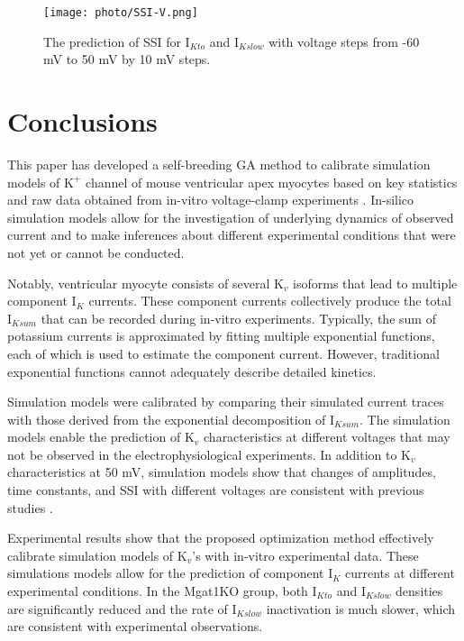 \documentclass[journal]{IEEEtran}
\begin{document}
\begin{figure}
    \label{fig 10}
    \centering
    \texttt{[image: photo/SSI-V.png]}
    \caption{The prediction of SSI for $\text{I}_{Kto}$ and $\text{I}_{Kslow}$ with voltage steps from -60 mV to 50 mV by 10 mV steps.} 
\end{figure}

\section{Conclusions}
This paper has developed a self-breeding GA method to calibrate simulation models of $\text{K}^{+}$ channel of mouse ventricular apex myocytes based on key statistics and raw data obtained from in-vitro voltage-clamp experiments \cite{ednie2019reduced}. In-silico simulation models allow for the investigation of underlying dynamics of observed current and to make inferences about different experimental conditions that were not yet or cannot be conducted.

Notably, ventricular myocyte consists of several $\text{K}_{v}$ isoforms that lead to multiple component $\text{I}_{K}$ currents. These component currents collectively produce the total $\text{I}_{Ksum}$ that can be recorded during in-vitro experiments. Typically, the sum of potassium currents is approximated by fitting multiple exponential functions, each of which is used to estimate the component current. However, traditional exponential functions cannot adequately describe detailed kinetics.

Simulation models were calibrated by comparing their simulated current traces with those derived from the exponential decomposition of $\text{I}_{Ksum}$. The simulation models enable the prediction of $\text{K}_{v}$ characteristics at different voltages that may not be observed in the electrophysiological experiments. In addition to $\text{K}_{v}$ characteristics at 50 mV, simulation models show that changes of amplitudes, time constants, and SSI with different voltages are consistent with previous studies \cite{ednie2019reduced}.

Experimental results show that the proposed optimization method effectively calibrate simulation models of $\text{K}_{v}$'s with in-vitro experimental data. These simulations models allow for the prediction of component $\text{I}_{K}$ currents at different experimental conditions. In the Mgat1KO group, both $\text{I}_{Kto}$ and $\text{I}_{Kslow}$ densities are significantly reduced and the rate of $\text{I}_{Kslow}$ inactivation is much slower, which are consistent with experimental observations.
\end{document}
